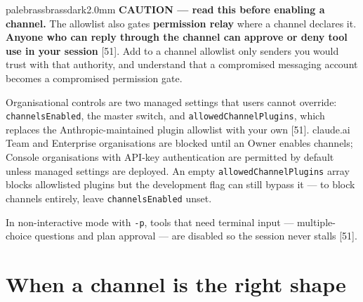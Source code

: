 \documentclass[11pt,a4paper,twoside,openany]{book}
\begin{document}
\begin{calloutbox}{palebrass}{brassdark}{2.0mm}
\textbf{CAUTION — read this before enabling a channel.} The allowlist also gates \textbf{permission relay} where a channel declares it. \textbf{Anyone who can reply through the channel can approve or deny tool use in your session} [51]. Add to a channel allowlist only senders you would trust with that authority, and understand that a compromised messaging account becomes a compromised permission gate.
\end{calloutbox}

Organisational controls are two managed settings that users cannot override: \texttt{channels\allowbreak{}Enabled}, the master switch, and \texttt{allowed\allowbreak{}Channel\allowbreak{}Plugins}, which replaces the Anthropic-maintained plugin allowlist with your own [51]. claude.ai Team and Enterprise organisations are blocked until an Owner enables channels; Console organisations with API-key authentication are permitted by default unless managed settings are deployed. An empty \texttt{allowed\allowbreak{}Channel\allowbreak{}Plugins} array blocks allowlisted plugins but the development flag can still bypass it — to block channels entirely, leave \texttt{channels\allowbreak{}Enabled} unset.


In non-interactive mode with \texttt{-\allowbreak{}p}, tools that need terminal input — multiple-choice questions and plan approval — are disabled so the session never stalls [51].


\FloatBarrier
\setcounter{section}{2}
\section{When a channel is the right shape}
\end{document}

